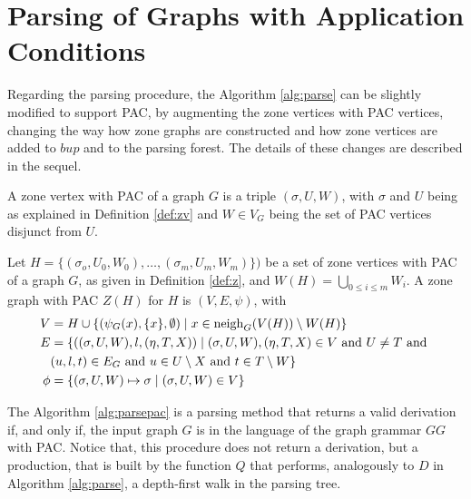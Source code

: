 \section{Parsing of Graphs with Application Conditions}
Regarding the parsing procedure, the Algorithm \ref{alg:parse} can be slightly modified to support PAC, by augmenting the zone vertices with PAC vertices, changing the way how zone graphs are constructed and how zone vertices are added to $bup$ and to the parsing forest. The details of these changes are described in the sequel.

\begin{definition}
	A zone vertex with PAC of a graph $G$ is a triple $(\sigma, U, W)$, with $\sigma$ and $U$ being as explained in Definition \ref{def:zv} and $W \in V_G$ being the set of PAC vertices disjunct from $U$.
\end{definition}

\begin{definition}
	Let $H = \{(\sigma_o,U_0,W_0), \dots, (\sigma_m, U_m, W_m)\})$ be a set of zone vertices with PAC of a graph $G$, as given in Definition \ref{def:z}, and $W(H) = \bigcup_{0 \le i \le m}{W_i}$. A zone graph with PAC $Z(H)$ for $H$ is $(V,E,\psi)$, with
	\begin{align*}
		V & = H \cup \{(\psi_G(x),\{x\}, \emptyset) \; | \; x \in \operatorname{neigh}_{G}(V(H)) \setminus W(H) \} \\
		E & = \{((\sigma,U,W),l,(\eta,T,X)) \; | \; (\sigma,U,W),(\eta,T,X) \in V \text{ and } U \neq T \text{ and } \\
		& (u,l,t) \in E_G \text{ and } u \in U \setminus X \text{ and } t \in T \setminus W \} \\
		\phi & = \{(\sigma,U,W) \mapsto \sigma \; | \; (\sigma,U,W) \in V\}
	\end{align*}
\end{definition}

The Algorithm \ref{alg:parsepac} is a parsing method that returns a valid derivation if, and only if, the input graph $G$ is in the language of the graph grammar $GG$ with PAC. Notice that, this procedure does not return a derivation, but a production, that is built by the function $Q$ that performs, analogously to $D$ in Algorithm \ref{alg:parse}, a depth-first walk in the parsing tree.

